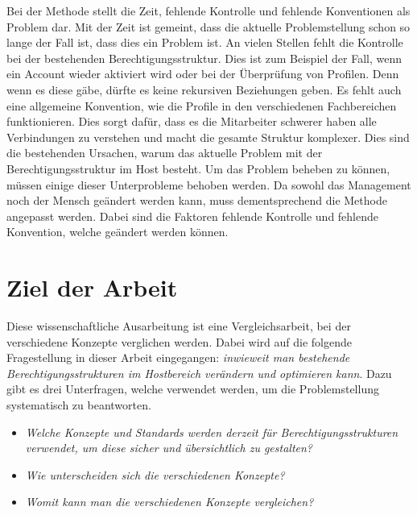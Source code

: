 \newline
Bei der Methode stellt die Zeit, fehlende Kontrolle und fehlende Konventionen als Problem dar.
Mit der Zeit ist gemeint, dass die aktuelle Problemstellung schon so lange der Fall ist, dass dies ein Problem ist.
An vielen Stellen fehlt die Kontrolle bei der bestehenden Berechtigungsstruktur.
Dies ist zum Beispiel der Fall, wenn ein Account wieder aktiviert wird oder bei der Überprüfung von Profilen.
Denn wenn es diese gäbe, dürfte es keine rekursiven Beziehungen geben.
Es fehlt auch eine allgemeine Konvention, wie die Profile in den verschiedenen Fachbereichen funktionieren.
Dies sorgt dafür, dass es die Mitarbeiter schwerer haben alle Verbindungen zu verstehen und macht die gesamte Struktur komplexer.
\newline
Dies sind die bestehenden Ursachen, warum das aktuelle Problem mit der Berechtigungsstruktur im Host besteht.
Um das Problem beheben zu können, müssen einige dieser Unterprobleme behoben werden.
Da sowohl das Management noch der Mensch geändert werden kann, muss dementsprechend die Methode angepasst werden.
Dabei sind die Faktoren fehlende Kontrolle und fehlende Konvention, welche geändert werden können.
\newpage

\section{Ziel der Arbeit}
\label{sec:intro:goal}
Diese wissenschaftliche Ausarbeitung ist eine Vergleichsarbeit, bei der verschiedene Konzepte verglichen werden.
Dabei wird auf die folgende Fragestellung in dieser Arbeit eingegangen: \textit{inwieweit man bestehende Berechtigungsstrukturen im Hostbereich verändern und optimieren kann}.
Dazu gibt es drei Unterfragen, welche verwendet werden, um die Problemstellung systematisch zu beantworten.

\begin{itemize}
  \item \textit{Welche Konzepte und Standards werden derzeit für Berechtigungsstrukturen verwendet, um diese sicher und übersichtlich zu gestalten?}
  \item \textit{Wie unterscheiden sich die verschiedenen Konzepte?}
  \item \textit{Womit kann man die verschiedenen Konzepte vergleichen?}
\end{itemize}

